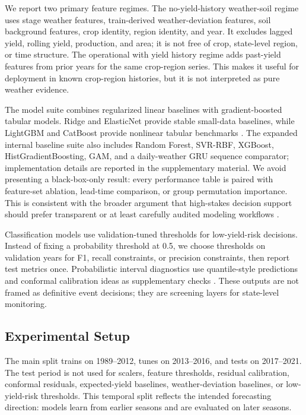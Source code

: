 \documentclass[wcp]{jmlr}
\begin{document}
We report two primary feature regimes. The no-yield-history weather-soil regime uses stage weather features, train-derived weather-deviation features, soil background features, crop identity, region identity, and year. It excludes lagged yield, rolling yield, production, and area; it is not free of crop, state-level region, or time structure. The operational with yield history regime adds past-yield features from prior years for the same crop-region series. This makes it useful for deployment in known crop-region histories, but it is not interpreted as pure weather evidence.

The model suite combines regularized linear baselines with gradient-boosted tabular models. Ridge and ElasticNet provide stable small-data baselines, while LightGBM and CatBoost provide nonlinear tabular benchmarks \citep{ke2017lightgbm,prokhorenkova2018catboost}. The expanded internal baseline suite also includes Random Forest, SVR-RBF, XGBoost, HistGradientBoosting, GAM, and a daily-weather GRU sequence comparator; implementation details are reported in the supplementary material. We avoid presenting a black-box-only result: every performance table is paired with feature-set ablation, lead-time comparison, or group permutation importance. This is consistent with the broader argument that high-stakes decision support should prefer transparent or at least carefully audited modeling workflows \citep{rudin2022blackboxBrief}.

Classification models use validation-tuned thresholds for low-yield-risk decisions. Instead of fixing a probability threshold at 0.5, we choose thresholds on validation years for F1, recall constraints, or precision constraints, then report test metrics once. Probabilistic interval diagnostics use quantile-style predictions and conformal calibration ideas as supplementary checks \citep{romano2019cqr,angelopoulos2023conformal}. These outputs are not framed as definitive event decisions; they are screening layers for state-level monitoring.

\subsection{Experimental Setup}

The main split trains on 1989--2012, tunes on 2013--2016, and tests on 2017--2021. The test period is not used for scalers, feature thresholds, residual calibration, conformal residuals, expected-yield baselines, weather-deviation baselines, or low-yield-risk thresholds. This temporal split reflects the intended forecasting direction: models learn from earlier seasons and are evaluated on later seasons.
\end{document}
